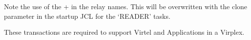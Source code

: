 \documentclass[letterpaper,10pt,english]{sphinxmanual}
\begin{document}
\begin{sphinxVerbatim}[commandchars=\\\{\}]
                                            
                                                 
                             
                                                         
                                                     
                                                        
                                                       
\end{sphinxVerbatim}

\sphinxAtStartPar
Note the use of the + in the relay names. This will be overwritten with the clone parameter in the startup JCL for the ‘READER’ tasks.

\sphinxAtStartPar
{}

\sphinxAtStartPar
These transactions are required to support Virtel and Applications in a Virplex.
\end{document}
